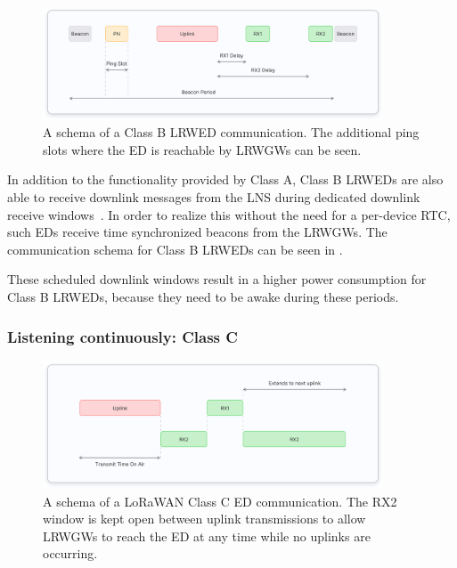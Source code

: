 \begin{figure}[htbp]
    \centering
    \includegraphics[width=0.9\textwidth]{pictures/device-classes/class-b.png}
    \caption[Schema of a \ac{LoRaWAN} Class B \acl{ED} communication]{
        A schema of a Class B \acl{LRWED} communication.
        The additional ping slots where the \acl{ED} is reachable by \aclp{LRWGW} can be seen.~\protect\cite{the_things_industries_bv_device_nodate}
    }\label{pic:lorawan-device-class-b-schema}
\end{figure}

In addition to the functionality provided by Class A, Class B \aclp{LRWED} are also able to receive downlink messages from the \ac{LNS} during dedicated downlink receive windows~\cite[p. 67]{lora_alliance_inc_lorawan_specification_2017}.
In order to realize this without the need for a per-device \ac{RTC}, such \aclp{ED} receive time synchronized beacons from the \aclp{LRWGW}.
The communication schema for Class B \aclp{LRWED} can be seen in .

These scheduled downlink windows result in a higher power consumption for Class B \aclp{LRWED}, because they need to be awake during these periods.

\subsubsection{Listening continuously: Class C}

\begin{figure}[htbp]
    \centering
    \includegraphics[width=0.9\textwidth]{pictures/device-classes/class-c.png}
    \caption[Schema of a \ac{LoRaWAN} Class C \acl{ED} communication]{
        A schema of a \ac{LoRaWAN} Class C \acl{ED} communication.
        The RX2 window is kept open between uplink transmissions to allow \aclp{LRWGW} to reach the \acl{ED} at any time while no uplinks are occurring.~\protect\cite{the_things_industries_bv_device_nodate}
    }\label{pic:lorawan-device-class-c-schema}
\end{figure}

